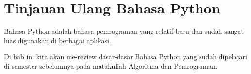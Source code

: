 
\chapter{Tinjauan Ulang Bahasa Python}

Bahasa Python adalah  bahasa pemrograman yang relatif baru dan sudah sangat luas digunakan di berbagai aplikasi.

Di bab ini kita akan me-review dasar-dasar Bahasa Python yang sudah dipelajari di semester sebelumnya pada matakuliah Algoritma dan Pemrograman.



